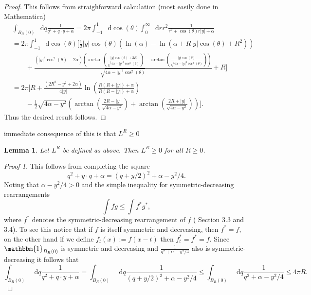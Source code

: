 \documentclass[a4paper,11pt]{article}
\newcommand{\abs}[1]{\left\lvert #1 \right\rvert}
\newcommand*\diff{\mathop{}\!\mathrm{d}}
\newtheorem{lemma}{Lemma}
\numberwithin{equation}{section}
\begin{document}
\begin{proof}
	This follows from straighforward calculation (most easily done in Mathematica)\begin{equation}
	\begin{aligned}
	&\int_{B_R(0)}\diff q\frac{1}{q^2+q\cdot y+\alpha}=2\pi\int_{-1}^{1}\diff \cos(\theta)\int_{0}^{\infty}\diff r r^2\frac{1}{r^2+\cos(\theta)r\abs{y}+\alpha}\\&
	=2\pi\int_{-1}^{1}\diff \cos(\theta)  \Bigg[\frac{1}{2} \left| y\right|  \cos (\theta ) \left(\ln (\alpha )-\ln \left(\alpha +R \left| y\right|  \cos (\theta )+R^2\right)\right)\\&\qquad+\frac{\left(\left| y\right| ^2 \cos ^2(\theta )-2 \alpha \right) \left(\arctan\left(\frac{\left| y\right|  \cos (\theta )+2 R}{\sqrt{4 \alpha -\left| y\right| ^2 \cos ^2(\theta )}}\right)-\arctan\left(\frac{\left| y\right|  \cos (\theta )}{\sqrt{4 \alpha -\left| y\right| ^2 \cos ^2(\theta )}}\right)\right)}{\sqrt{4 \alpha -\left| y\right| ^2 \cos ^2(\theta )}}+R\Bigg]\\
	&=2\pi \Bigg[R+\frac{(2R^2-y^2+2\alpha)}{4\abs{y}}\ln\left(\frac{R(R+\abs{y})+\alpha}{R(R-\abs{y})+\alpha}\right)\\
	&\qquad-\frac{1}{2}\sqrt{4\alpha-y^2}\left(\arctan\left(\frac{2R-\abs{y}}{\sqrt{4\alpha-y^2}}\right)+\arctan\left(\frac{2R+\abs{y}}{\sqrt{4\alpha-y^2}}\right)\right)\Bigg].
	\end{aligned}
	\end{equation}
	Thus the desired result follows.
\end{proof}
immediate consequence of this is that $ L^R\geq0 $ \begin{lemma}\label{LemmaLgreater0}
	Let $ L^R $ be defined as above. Then $ L^R\geq0 $ for all $ R\geq0 $.
\end{lemma}
\begin{proof}[Proof 1]
	This follows from completing the square \begin{equation}
	q^2+y\cdot q+\alpha=(q+y/2)^2+\alpha-y^2/4.
	\end{equation}
	Noting that $ \alpha-y^2/4>0 $ and the simple inequality for symmetric-decreasing rearrangements\begin{equation}
	\int fg\leq\int f^*g^*,
	\end{equation}
	where $ f^* $ denotes the symmetric-decreasing rearrangement of $ f $ (\cite{lieb2001analysis} Section 3.3 and 3.4). To see this notice that if $ f $ is itself symmetric and decreasing, then $ f^*=f $, on the other hand if we define $ f_t(x):=f(x-t) $ then $ f_t^*=f^*=f $. Since $ \mathbbm{1}_{B_R(0)} $ is symmetric and decreasing and $ \frac{1}{q^2+\alpha-y^2/4} $ also is symmetric-decreasing it follows that \begin{equation}
	\int_{B_R(0)}\diff q \frac{1}{q^2+q\cdot y+\alpha}=\int_{B_R(0)}\diff q \frac{1}{(q+y/2)^2+\alpha-y^2/4}\leq\int_{B_R(0)}\diff q \frac{1}{q^2+\alpha-y^2/4}\leq4\pi R.
	\end{equation}
\end{proof}
\end{document}
